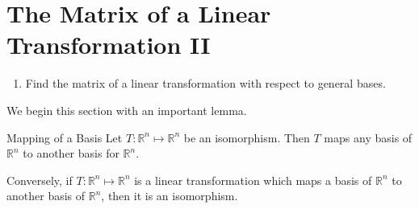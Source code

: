 \section{The Matrix of a Linear Transformation II}


\begin{outcome}

\begin{enumerate}

\item[A.] Find the matrix of a linear transformation with respect to general bases. 

\end{enumerate}
\end{outcome}

We begin this section with an important lemma. 

\begin{lemma}{Mapping of a Basis}\label{lem:mappingbasis}
Let $T: \mathbb{R}^n \mapsto \mathbb{R}^n$ be an isomorphism.  Then $T$ maps any basis of
$\mathbb{R}^n$ to another basis for $\mathbb{R}^n$. 

Conversely, if $T:
\mathbb{R}^n \mapsto \mathbb{R}^n$ is a linear transformation which
maps a basis of $\mathbb{R}^n$ to another basis of $\mathbb{R}^n$,
then it is an isomorphism.
\end{lemma}

